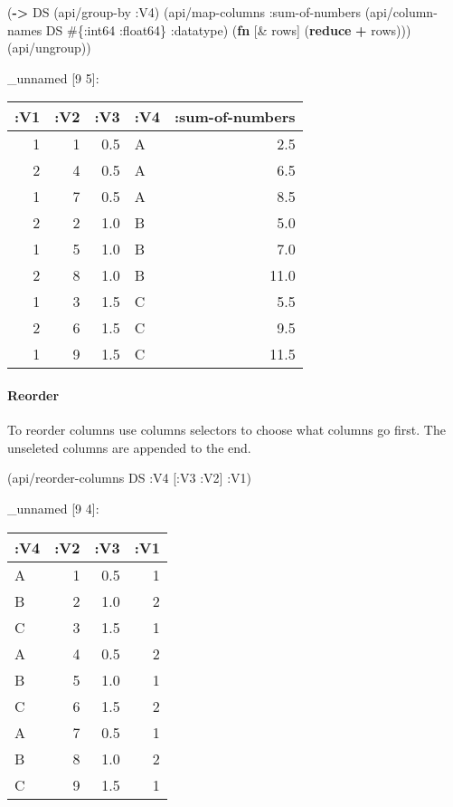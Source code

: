 \documentclass[]{article}
\newenvironment{Shaded}{\begin{snugshade}}{\end{snugshade}}
\newcommand{\KeywordTok}[1]{\textcolor[rgb]{0.13,0.29,0.53}{\textbf{#1}}}
\newcommand{\AttributeTok}[1]{\textcolor[rgb]{0.77,0.63,0.00}{#1}}
\newcommand{\NormalTok}[1]{#1}
\let\oldparagraph\paragraph
\renewcommand{\paragraph}[1]{\oldparagraph{#1}\mbox{}}
\begin{document}
\begin{Shaded}
\begin{Highlighting}[]
\NormalTok{(}\KeywordTok{->}\NormalTok{ DS}
\NormalTok{    (api/group-by }\AttributeTok{:V4}\NormalTok{)}
\NormalTok{    (api/map-columns }\AttributeTok{:sum-of-numbers}
\NormalTok{                     (api/column-names DS  #\{}\AttributeTok{:int64} \AttributeTok{:float64}\NormalTok{\} }\AttributeTok{:datatype}\NormalTok{)}
\NormalTok{                     (}\KeywordTok{fn}\NormalTok{ [& rows]}
\NormalTok{                       (}\KeywordTok{reduce} \KeywordTok{+}\NormalTok{ rows)))}
\NormalTok{    (api/ungroup))}
\end{Highlighting}
\end{Shaded}

\_unnamed {[}9 5{]}:

\begin{longtable}[]{@{}rrrlr@{}}
\toprule
:V1 & :V2 & :V3 & :V4 & :sum-of-numbers\tabularnewline
\midrule
\endhead
1 & 1 & 0.5 & A & 2.5\tabularnewline
2 & 4 & 0.5 & A & 6.5\tabularnewline
1 & 7 & 0.5 & A & 8.5\tabularnewline
2 & 2 & 1.0 & B & 5.0\tabularnewline
1 & 5 & 1.0 & B & 7.0\tabularnewline
2 & 8 & 1.0 & B & 11.0\tabularnewline
1 & 3 & 1.5 & C & 5.5\tabularnewline
2 & 6 & 1.5 & C & 9.5\tabularnewline
1 & 9 & 1.5 & C & 11.5\tabularnewline
\bottomrule
\end{longtable}

\paragraph{Reorder}\label{reorder}

To reorder columns use columns selectors to choose what columns go
first. The unseleted columns are appended to the end.

\begin{Shaded}
\begin{Highlighting}[]
\NormalTok{(api/reorder-columns DS }\AttributeTok{:V4}\NormalTok{ [}\AttributeTok{:V3} \AttributeTok{:V2}\NormalTok{] }\AttributeTok{:V1}\NormalTok{)}
\end{Highlighting}
\end{Shaded}

\_unnamed {[}9 4{]}:

\begin{longtable}[]{@{}lrrr@{}}
\toprule
:V4 & :V2 & :V3 & :V1\tabularnewline
\midrule
\endhead
A & 1 & 0.5 & 1\tabularnewline
B & 2 & 1.0 & 2\tabularnewline
C & 3 & 1.5 & 1\tabularnewline
A & 4 & 0.5 & 2\tabularnewline
B & 5 & 1.0 & 1\tabularnewline
C & 6 & 1.5 & 2\tabularnewline
A & 7 & 0.5 & 1\tabularnewline
B & 8 & 1.0 & 2\tabularnewline
C & 9 & 1.5 & 1\tabularnewline
\bottomrule
\end{longtable}
\end{document}
